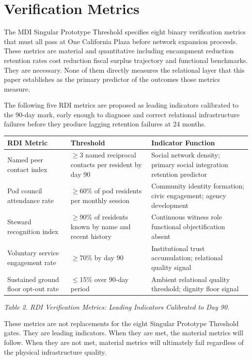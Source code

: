 \documentclass[12pt, letterpaper]{article}
\begin{document}
\clearpage
\section{Verification Metrics}

The MDI Singular Prototype Threshold specifies eight binary verification metrics that must all pass at One California Plaza before network expansion proceeds. These metrics are material and quantitative including encampment reduction retention rates cost reduction fiscal surplus trajectory and functional benchmarks. They are necessary. None of them directly measures the relational layer that this paper establishes as the primary predictor of the outcomes those metrics measure.

The following five RDI metrics are proposed as leading indicators calibrated to the 90-day mark, early enough to diagnose and correct relational infrastructure failures before they produce lagging retention failures at 24 months.

{\singlespacing
\begin{tabularx}{\textwidth}{@{}lp{3cm}X@{}}
\toprule
\rowcolor{rowgray}
RDI Metric & Threshold & Indicator Function \\
\midrule
Named peer contact index & $\geq$3 named reciprocal contacts per resident by day 90 & Social network density; primary social integration retention predictor \\
\rowcolor{rowgray}
Pod council attendance rate & $\geq$60\% of pod residents per monthly session & Community identity formation; civic engagement; agency development \\
Steward recognition index & $\geq$90\% of residents known by name and recent history & Continuous witness role functional objectification absent \\
\rowcolor{rowgray}
Voluntary service engagement rate & $\geq$70\% by day 90 & Institutional trust accumulation; relational quality signal \\
Sustained ground floor opt-out rate & $\leq$15\% over 90-day period & Ambient relational quality threshold; dignity floor signal \\
\bottomrule
\end{tabularx}\par
\vspace{8pt}
\noindent\textit{Table 2. RDI Verification Metrics: Leading Indicators Calibrated to Day 90.}
\par}

These metrics are not replacements for the eight Singular Prototype Threshold gates. They are leading indicators. When they are met, the material metrics will follow. When they are not met, material metrics will ultimately fail regardless of the physical infrastructure quality.
\end{document}
